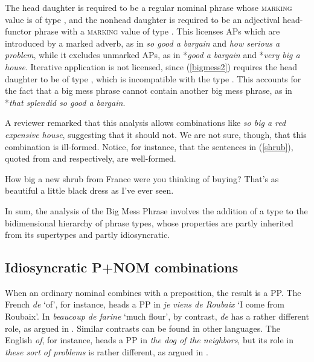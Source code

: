 \documentclass[output=paper
                ,modfonts
                ,nonflat
	        ,collection
	        ,collectionchapter
	        ,collectiontoclongg
 	        ,biblatex
                ,babelshorthands
                ,newtxmath
                ,draftmode
                ,colorlinks, citecolor=brown
]{./langsci/langscibook}
\begin{document}
\noindent
The head daughter is required to be a regular nominal phrase 
whose \textsc{marking} value is of type , and the nonhead daughter 
is required to be an adjectival head-functor phrase
with a \textsc{marking} value of type . 
This licenses APs which are introduced by a marked adverb, 
as in \emph{so good a bargain} and \emph{how serious a problem}, 
while it excludes unmarked APs, as in 
*\emph{good a bargain} and *\emph{very big a house}.
Iterative application is not licensed, since (\ref{bigmess2}) requires the 
head daughter to be of type , which is incompatible with the type 
. This accounts for the fact that a big
mess phrase cannot contain another big mess phrase, as in
*\emph{that splendid so good a bargain}.

A reviewer remarked that this analysis allows combinations like 
\emph{so big a red expensive house}, suggesting that it should not. 
We are not sure, though, that this combination is ill-formed.
Notice, for instance, that the sentences in (\ref{shrub}), 
quoted from \citet[116]{Zwicky95} and \citet[42]{Troseth09} respectively, 
are well-formed. 

\begin{exe} 
\ex\label{shrub} 
\begin{xlist} 
\ex  How big a new shrub from France were you thinking of buying? 
\ex  That's as beautiful a little black dress as I've ever seen.  
\end{xlist} 
\end{exe} 

In sum, the analysis of the Big Mess Phrase involves the addition of 
a type to the bidimensional hierarchy of phrase types, whose properties 
are partly inherited from its supertypes and partly idiosyncratic.      


\subsection{Idiosyncratic P+NOM combinations} 
\label{prep}


When an ordinary nominal combines with a preposition, the result is a PP. 
The French \emph{de} `of', for instance, heads a PP in 
\emph{je viens de Roubaix} `I come from Roubaix'. 
In \emph{beaucoup de farine} `much flour', by contrast, \emph{de} has 
a rather different role, as argued in \citet{Abeilleetal04}. 
Similar contrasts can be found in other languages. The English \emph{of}, for instance, 
heads a PP in \emph{the dog of the neighbors}, but its role in \emph{these sort of problems} 
is rather different, as argued in \citet{Maekawa15}.  
\end{document}
